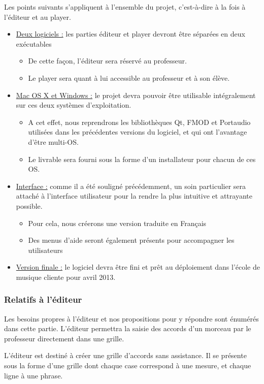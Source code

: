 Les points suivants s'appliquent à l'ensemble du projet, c'est-à-dire à la fois à l'éditeur et au player.
\begin{itemize}
 \item \underline{Deux logiciels :} les parties éditeur et player devront être séparées en deux exécutables
 \begin{itemize}
  \item De cette façon, l'éditeur sera réservé au professeur.
  \item Le player sera quant à lui accessible au professeur et à son élève.
 \end{itemize}
 \item \underline{Mac OS X et Windows :} le projet devra pouvoir être utilisable intégralement sur ces deux systèmes d'exploitation.
 \begin{itemize}
  \item A cet effet, nous reprendrons les bibliothèques Qt, FMOD et Portaudio utilisées dans les précédentes versions du logiciel, et qui ont l'avantage d'être multi-OS.
  \item Le livrable sera fourni sous la forme d'un installateur pour chacun de ces OS.
 \end{itemize}
 \item \underline{Interface :} comme il a été souligné précédemment, un soin particulier sera attaché à l'interface utilisateur pour la rendre la plus intuitive et attrayante possible.
 \begin{itemize}
  \item Pour cela, nous créerons une version traduite en Français
  \item Des menus d'aide seront également présents pour accompagner les utilisateurs
 \end{itemize}
 \item \underline{Version finale :} le logiciel devra être fini et prêt au déploiement dans l'école de musique cliente pour avril 2013.
\end{itemize}

\subsubsection*{Relatifs à l'éditeur}

Les besoins propres à l'éditeur et nos propositions pour y répondre sont énumérés dans cette partie. L'éditeur permettra la saisie des accords d'un morceau par le professeur directement dans une grille.

L'éditeur est destiné à créer une grille d'accords sans assistance. Il se présente sous la forme d'une grille dont chaque case correspond à une mesure, et chaque ligne à une phrase.

